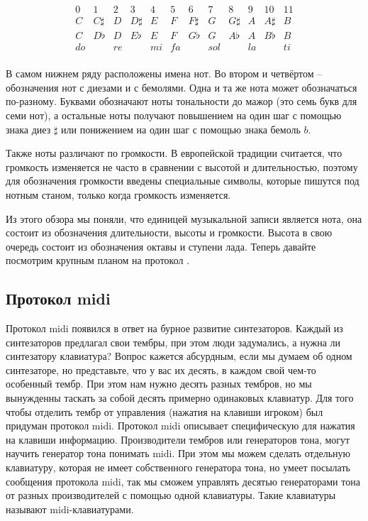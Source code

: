 \[\begin{array}{llllllllllll}
    0   &   1    & 2 & 3    & 4 & 5 & 6 & 7 & 8 & 9 & 10 & 11 \\
  C   &   C\sharp  & D & D\sharp  & E & F & F\sharp &
  G   &   G\sharp  & A & A\sharp & B \\ 
 C   &  D\flat    & D & E\flat & E & F & G\flat & G & A\flat 
 & A & B\flat & B \\
 do & & re & & mi & fa & & sol & & la & & ti \\
\end{array}\]

В самом нижнем ряду расположены имена нот. Во втором и четвёртом --
обозначения нот с диезами и с бемолями. Одна и та же нота может
обозначаться по-разному. Буквами обозначают ноты тональности до мажор
(это семь букв для семи нот), а остальные ноты получают повышением на
один шаг с помощью знака диез $\sharp$ или понижением на один шаг с
помощью знака бемоль $b$.

Также ноты различают по громкости. В европейской традиции считается, что
громкость изменяется не часто в сравнении с высотой и длительностью,
поэтому для обозначения громкости введены специальные символы, которые
пишутся под нотным станом, только когда громкость изменяется.

Из этого обзора мы поняли, что единицей музыкальной записи является
нота, она состоит из обозначения длительности, высоты и громкости.
Высота в свою очередь состоит из обозначения октавы и ступени лада.
Теперь давайте посмотрим крупным планом на протокол .

\subsection{Протокол midi}

Протокол midi появился в ответ на бурное развитие синтезаторов. Каждый
из синтезаторов предлагал свои тембры, при этом люди задумались, а нужна
ли синтезатору клавиатура? Вопрос кажется абсурдным, если мы думаем об
одном синтезаторе, но представьте, что у вас их десять, в каждом свой
чем-то особенный тембр. При этом нам нужно десять разных тембров, но мы
вынужденны таскать за собой десять примерно одинаковых клавиатур. Для
того чтобы отделить тембр от управления (нажатия на клавиши игроком) был
придуман протокол midi. Протокол midi описывает специфическую для
нажатия на клавиши информацию. Производители тембров или генераторов
тона, могут научить генератор тона понимать midi. При этом мы можем
сделать отдельную клавиатуру, которая не имеет собственного генератора
тона, но умеет посылать сообщения протокола midi, так мы сможем
управлять десятью генераторами тона от разных производителей с помощью
одной клавиатуры. Такие клавиатуры называют midi-клавиатурами.

